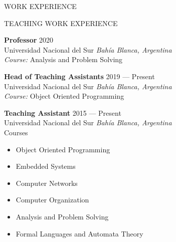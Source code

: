 \documentclass{resume} %
\begin{document}
\begin{rSection}{WORK EXPERIENCE}

\end{rSection}

\begin{rSection}{TEACHING WORK EXPERIENCE}

\textbf{Professor} \hfill  2020\\
Universidad Nacional del Sur \hfill \textit{Bahía Blanca, Argentina}
\\\textit{Course:} Analysis and Problem Solving


\bigskip
\textbf{Head of Teaching Assistants} \hfill  2019 --- Present\\
Universidad Nacional del Sur \hfill \textit{Bahía Blanca, Argentina}
\\\textit{Course:} Object Oriented Programming


\bigskip
\textbf{Teaching Assistant} \hfill  2015 --- Present\\
Universidad Nacional del Sur \hfill \textit{Bahía Blanca, Argentina}
\\ Courses
\begin{itemize}
    \item Object Oriented Programming\vspace{-0.1cm}
    \item Embedded Systems \vspace{-0.1cm}
    \item Computer Networks   \vspace{-0.1cm}
    \item Computer Organization  \vspace{-0.1cm}
    \item Analysis and Problem Solving  \vspace{-0.1cm}
    \item Formal Languages and Automata Theory
\end{itemize}



\end{rSection}
\end{document}
